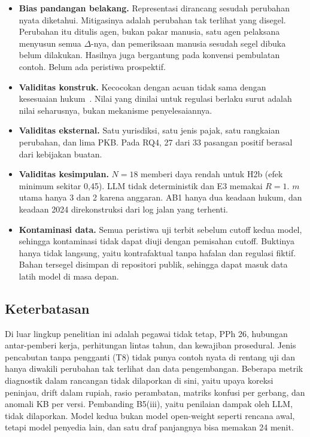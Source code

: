 \documentclass[journal,a4paper]{IEEEtran}
\makeatletter
\DeclareRobustCommand{\en}[1]{{\usefont{\f@encoding}{\f@family}{\f@series}{it}#1\/}}
\makeatother
\begin{document}
\begin{itemize}[leftmargin=*,nosep]
  \item \textbf{Bias pandangan belakang.} Representasi dirancang sesudah perubahan nyata diketahui. Mitigasinya adalah perubahan tak terlihat yang disegel. Perubahan itu ditulis agen, bukan pakar manusia, satu agen pelaksana menyusun semua $\Delta$-nya, dan pemeriksaan manusia sesudah segel dibuka belum dilakukan. Hasilnya juga bergantung pada konvensi pembulatan contoh. Belum ada peristiwa prospektif.
  \item \textbf{Validitas konstruk.} Kecocokan dengan acuan tidak sama dengan kesesuaian hukum~\cite{witt2024encoding}. Nilai yang dinilai untuk regulasi berlaku surut adalah nilai seharusnya, bukan mekanisme penyelesaiannya.
  \item \textbf{Validitas eksternal.} Satu yurisdiksi, satu jenis pajak, satu rangkaian perubahan, dan lima PKB. Pada RQ4, 27 dari 33 pasangan positif berasal dari kebijakan buatan.
  \item \textbf{Validitas kesimpulan.} $N = 18$ memberi daya rendah untuk H2b (efek minimum sekitar 0,45). LLM tidak deterministik dan E3 memakai $R = 1$. $m$ utama hanya 3 dan 2 karena anggaran. AB1 hanya dua keadaan hukum, dan keadaan 2024 direkonstruksi dari log jalan yang terhenti.
  \item \textbf{Kontaminasi data.} Semua peristiwa uji terbit sebelum \en{cutoff} kedua model, sehingga kontaminasi tidak dapat diuji dengan pemisahan \en{cutoff}. Buktinya hanya tidak langsung, yaitu kontrafaktual tanpa hafalan dan regulasi fiktif. Bahan tersegel disimpan di repositori publik, sehingga dapat masuk data latih model di masa depan.
\end{itemize}

\subsection{Keterbatasan}
Di luar lingkup penelitian ini adalah pegawai tidak tetap, PPh 26, hubungan antar-pemberi kerja, perhitungan lintas tahun, dan kewajiban prosedural. Jenis pencabutan tanpa pengganti (T8) tidak punya contoh nyata di rentang uji dan hanya diwakili perubahan tak terlihat dan data pengembangan. Beberapa metrik diagnostik dalam rancangan tidak dilaporkan di sini, yaitu upaya koreksi peninjau, \en{drift} dalam rupiah, rasio perambatan, matriks konfusi per gerbang, dan anomali KB per versi. Pembanding B5(iii), yaitu penilaian dampak oleh LLM, tidak dilaporkan. Model kedua bukan model \en{open-weight} seperti rencana awal, tetapi model penyedia lain, dan satu draf panjangnya bisa memakan 24 menit.
\end{document}
